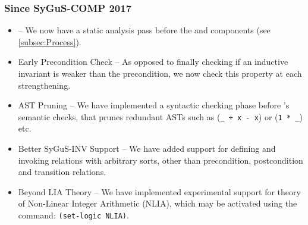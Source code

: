 \documentclass[conference]{IEEEtran}
\begin{document}
\subsubsection*{Since SyGuS-COMP 2017}
\begin{itemize}
    \item \Process --
          We now have a static analysis pass before the \Record and \Infer components (see \cref{subsec:Process}).

    \item Early Precondition Check --
          As opposed to finally checking if an inductive invariant is weaker than the precondition,
          we now check this property at each strengthening.

    \item AST Pruning --
          We have implemented a syntactic checking phase before 's semantic checks,
          that prunes redundant ASTs such as (\texttt{\_ + x - x}) or (\texttt{1 * \_}) etc.

    \item Better SyGuS-INV Support --
          We have added support for defining and invoking relations with arbitrary sorts,
          other than precondition, postcondition and transition relations.

    \item Beyond LIA Theory --
          We have implemented experimental support for theory of Non-Linear Integer Arithmetic (NLIA),
          which may be activated using the command: \texttt{(set-logic NLIA)}.
\end{itemize}
\end{document}
